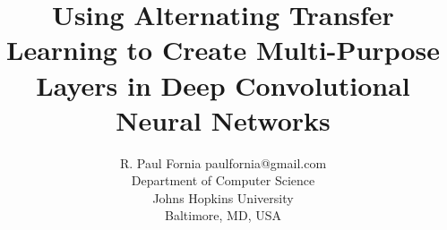 \documentclass[twoside,11pt]{article}
\begin{document}
\title{Using Alternating Transfer Learning to Create Multi-Purpose Layers
in Deep Convolutional Neural Networks}

\author{\name R. Paul Fornia \email paulfornia@gmail.com \\
       \addr Department of Computer Science\\
       Johns Hopkins University\\
       Baltimore, MD, USA
       }


\maketitle
\end{document}
